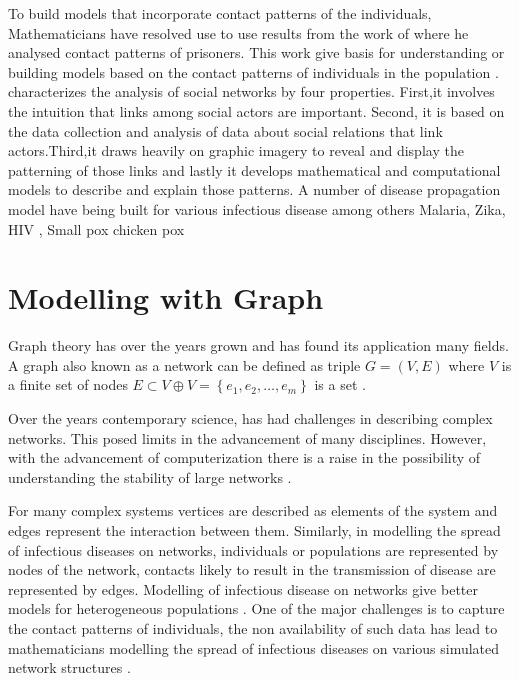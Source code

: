  
 To build models that incorporate contact patterns of the individuals, Mathematicians have resolved use to use results from the work of \cite{moreno1945application} where he analysed contact patterns of prisoners. This work give basis for understanding or building models based on the contact patterns of individuals in the population \citep{sat}. \cite{freeman2004development} characterizes the analysis of social networks by four properties. First,it involves the intuition
 that links among social actors 
are important. Second, it is based on the data collection and analysis of data about social relations that link actors.Third,it draws heavily on graphic imagery to reveal and display the patterning of those links and lastly it develops mathematical and computational models to describe and explain those patterns. 
 A number of disease propagation model have being built for various infectious disease among others Malaria, Zika, HIV , Small pox chicken pox \citep{ding2016mathematical}

\section{Modelling with Graph}
Graph theory has over the years grown and has found its application many fields. A graph also known as a network   can be  defined as triple $G = (V,E)$ where $V$ is a finite set of nodes $E \subset V \oplus V = \left\lbrace e_1,e_2,\dots ,e_m \right\rbrace$ is a set  \citep{estrada2012structure}. 

Over the years contemporary science, has had challenges in describing complex networks. This posed limits in the advancement of many disciplines. However, with the advancement  of computerization there is a raise in the possibility of understanding the stability of large networks \cite{barabasi1999emergence} .

For many complex systems vertices are described as elements of the system and edges represent the interaction between them. Similarly, in modelling the spread of  infectious diseases on networks, individuals or populations are represented by nodes of the network, contacts likely to result in the transmission of disease are represented by edges. Modelling of infectious disease on networks give better models for heterogeneous populations \citep{ming2016stochastic}. One of the major challenges is to capture the contact patterns of individuals, the non availability of such data has lead to mathematicians modelling the spread of infectious diseases on various simulated network structures \citep{pastor2001}.

